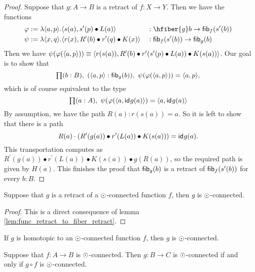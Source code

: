 \begin{proof}
Suppose that $g:A\to B$ is a retract of $f:X\to Y$. Then we have the functions
\begin{align*}
\varphi & :=\lambda\pairr{a,p}.\pairr{s(a),s^\prime(p)\bullet L(a)} & & :\hfiber{g}b\to\hfib{f}{s^\prime(b)}\\
\psi & := \lambda\pairr{x,q}.\pairr{r(x),R^\prime(b)\bullet r^\prime(q)\bullet K(x)} & &
:\hfib{f}{s^\prime(b)}\to\hfib{g}b
\end{align*}
Then we have $\psi(\varphi({\langle a,p\rangle}))\equiv{\langle r(s(a)),R^\prime(b)\bullet r^\prime(s^\prime(p)\bullet L(a))\bullet K(s(a))\rangle}$. Our goal
is to show that
\begin{equation*}
\prd{b:B}(\pairr{a,p}:\hfib{g}b),\ \psi(\varphi(\pairr{a,p}))= \pairr{a,p},
\end{equation*}
which is of course equivalent to the type
\begin{equation*}
\prd{a:A}\psi(\varphi(\pairr{a,\idfunc{g(a)}})=\pairr{a,\idfunc{g(a)}}
\end{equation*}
By assumption, we have the path $R(a):r(s(a))= a$. So it is left to show that there is a path
\begin{equation*}
R(a)\cdot (R^\prime(g(a))\bullet r^\prime(L(a))\bullet K(s(a)))= \mathsf{id}_{}{g(a)}.
\end{equation*}
This transportation computes as $R^\prime(g(a))\bullet r^\prime(L(a))\bullet K(s(a))\bullet g(R(a))$, so the required path is given by
$H(a)$. This finishes the proof that $\mathsf{fib}_{g}(b)$ is a retract of $\mathsf{fib}_{f}(s^\prime(b))$ for every $b:B$.
\end{proof}


\begin{lem}
Suppose that $g$ is a retract of a $\odot$-connected function $f$, then $g$ is
$\odot$-connected.
\end{lem}

\begin{proof}
This is a direct consequence of lemma \ref{lem:func_retract_to_fiber_retract}.
\end{proof}

\begin{cor}
If $g$ is homotopic to an $\odot$-connected function $f$, then $g$ is $\odot$-connected.
\end{cor}

\begin{lem}\label{lem:nconnected_postcomp}
Suppose that $f:A\to B$ is $\odot$-connected. Then $g:B\to C$ is $\odot$-connected if and only if $g\circ f$ is
$\odot$-connected.
\end{lem}


